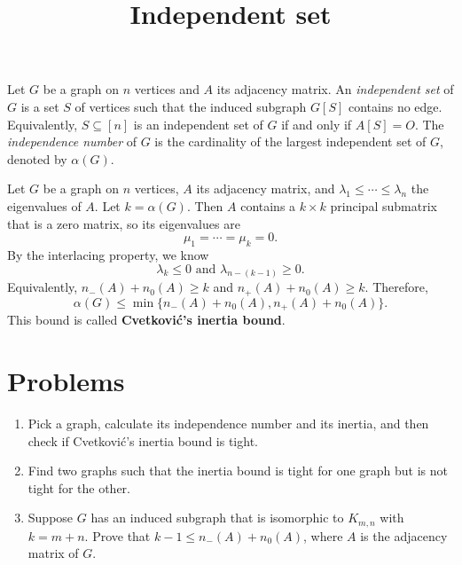 \documentclass{article}
\title{Independent set}
\date{\vspace{-1cm}}
\theoremstyle{definition}
\begin{document}
\maketitle
\large

Let $G$ be a graph on $n$ vertices and $A$ its adjacency matrix.  An \emph{independent set} of $G$ is a set $S$ of vertices such that the induced subgraph $G[S]$ contains no edge.  Equivalently, $S\subseteq[n]$ is an independent set of $G$ if and only if $A[S] = O$.  The \emph{independence number} of $G$ is the cardinality of the largest independent set of $G$, denoted by $\alpha(G)$.  

Let $G$ be a graph on $n$ vertices, $A$ its adjacency matrix, and $\lambda_1\leq \cdots \leq \lambda_n$ the eigenvalues of $A$.  Let $k = \alpha(G)$.  Then $A$ contains a $k\times k$ principal submatrix that is a zero matrix, so its eigenvalues are 
\[\mu_1 = \cdots = \mu_k = 0.\]
By the interlacing property, we know 
\[\lambda_k \leq 0 \text{ and } \lambda_{n - (k-1)} \geq 0.\]
Equivalently, $n_-(A) + n_0(A) \geq k$ and $n_+(A) + n_0(A) \geq k$.  Therefore, 
\[\alpha(G) \leq \min\{n_-(A) + n_0(A), n_+(A) + n_0(A)\}.\]
This bound is called \textbf{Cvetkovi\'c's inertia bound}.

\section*{Problems}
\begin{enumerate}
\setlength\itemsep{2em}
\item Pick a graph, calculate its independence number and its inertia, and then check if Cvetkovi\'c's inertia bound is tight.   
\item Find two graphs such that the inertia bound is tight for one graph but is not tight for the other.  
\item Suppose $G$ has an induced subgraph that is isomorphic to $K_{m,n}$ with $k = m + n$.  Prove that $k - 1 \leq n_-(A) + n_0(A)$, where $A$ is the adjacency matrix of $G$.
\end{enumerate}

\end{document}
